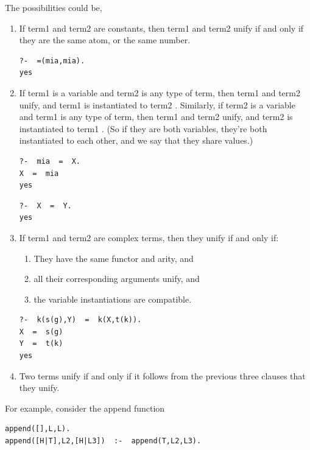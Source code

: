 \documentclass[thesis-solanki.tex]{subfiles}
\begin{document}
The possibilities could be,
\begin{enumerate}
\item If term1 and term2 are constants, then term1 and term2 unify if and only if they are the same atom, or the same number.
\begin{verbatim}
?-  =(mia,mia).
yes
\end{verbatim}

\item If term1 is a variable and term2 is any type of term, then term1 and term2 unify, and term1 is instantiated to term2 . Similarly, if 
term2 is a variable and term1 is any type of term, then term1 and term2 unify, and term2 is instantiated to term1 . (So if they are both 
variables, they’re both instantiated to each other, and we say that they share values.)
\begin{verbatim}
?-  mia  =  X.
X  =  mia 
yes
\end{verbatim}

\begin{verbatim}
?-  X  =  Y. 
yes
\end{verbatim}

\item If term1 and term2 are complex terms, then they unify if and only if:

\begin{enumerate}
\item They have the same functor and arity, and

\item all their corresponding arguments unify, and

\item the variable instantiations are compatible.
\end{enumerate}
\begin{verbatim}
?-  k(s(g),Y)  =  k(X,t(k)).
X  =  s(g) 
Y  =  t(k) 
yes
\end{verbatim}


\item Two terms unify if and only if it follows from the previous three clauses that they unify.
\end{enumerate} 

\newpage

For example, consider the append function 

\begin{verbatim}
append([],L,L). 
append([H|T],L2,[H|L3])  :-  append(T,L2,L3).
\end{verbatim}
\end{document}
